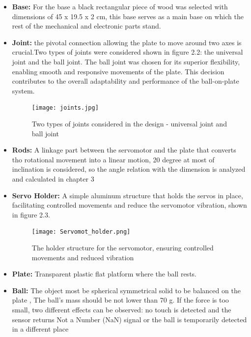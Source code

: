 \begin{itemize}
  \item \textbf{Base:} For the base a black rectangular piece of wood was selected with dimensions of 45 x 19.5 x 2 cm, this base serves as a main base on which the rest of the mechanical and electronic parts stand.
  
  \item \textbf{Joint:} the pivotal connection allowing the plate to move around two axes is crucial.Two types of joints were considered shown in figure 2.2: the universal joint and the ball joint. The ball joint was chosen for its superior flexibility, enabling smooth and responsive movements of the plate. This decision contributes to the overall adaptability and performance of the ball-on-plate system.
  
  \begin{figure}[h]
    \centering
    \texttt{[image: joints.jpg]}
    \caption{Two types of joints considered in the design - universal joint and ball joint}
    \label{fig:enter-label}
\end{figure}

  \item \textbf{Rods:} A linkage part between the servomotor and the plate that converts tho rotational movement into a linear motion, 20 degree at most of inclination is considered, so the angle relation with the dimension is analyzed and calculated in chapter 3
  
  \item \textbf{Servo Holder:} A simple aluminum structure that holds the servos in place, facilitating controlled movements and reduce the servomotor vibration, shown in figure 2.3.
  
\begin{figure}[h]
    \centering
    \texttt{[image: Servomot\_holder.png]}
    \caption{The holder structure for the servomotor, ensuring controlled movements and reduced vibration}
    \label{fig:enter-label}
\end{figure}
  \item \textbf{Plate:} Transparent plastic flat platform where the ball rests.
  \item \textbf{Ball:} The object most be spherical symmetrical solid to be balanced on the plate , The ball’s mass should be not lower than 70 g. If the force is too small, two different effects can be observed: no touch is detected and the sensor returns Not a Number (NaN) signal or the ball is temporarily detected in a different place
\end{itemize}

